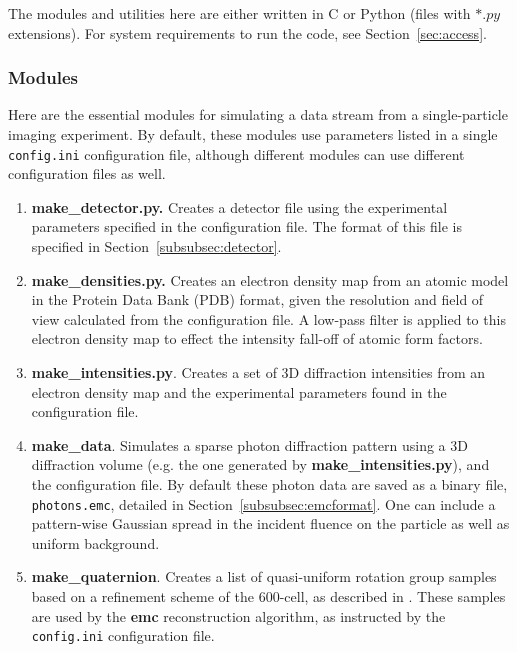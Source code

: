\documentclass[]{iucr}              %
\begin{document}
The modules and utilities here are either written in C or Python (files with $*.py$ extensions). For system requirements to run the code, see Section~\ref{sec:access}.

\subsubsection{Modules}\label{subsubsec:mods}
Here are the essential modules for simulating a data stream from a single-particle imaging experiment. By default, these modules use parameters listed in a single \texttt{config.ini} configuration file, although different modules can use different configuration files as well.

\begin{enumerate}
\item{\bf make\_detector.py.} Creates a detector file using the experimental parameters specified in the configuration file. The format of this file is specified in Section~\ref{subsubsec:detector}.
\item{\bf make\_densities.py.} Creates an electron density map from an atomic model in the Protein Data Bank (PDB) format, given the resolution and field of view calculated from the configuration file. A low-pass filter is applied to this electron density map to effect the intensity fall-off of atomic form factors.
\item{\bf make\_intensities.py}. Creates a set of 3D diffraction intensities from an electron density map and the experimental parameters found in the configuration file.  
\item{\bf make\_data}. Simulates a sparse photon diffraction pattern using a 3D diffraction volume (e.g. the one generated by {\bf make\_intensities.py}), and the configuration file. By default these photon data are saved as a binary file, \texttt{photons.emc}, detailed in Section~\ref{subsubsec:emcformat}. One can include a pattern-wise Gaussian spread in the incident fluence on the particle as well as uniform background.
\item{\bf make\_quaternion}. Creates a list of quasi-uniform rotation group samples based on a refinement scheme of the 600-cell, as described in . These samples are used by the {\bf emc} reconstruction algorithm, as instructed by the \texttt{config.ini} configuration file.
\end{enumerate}
\end{document}
